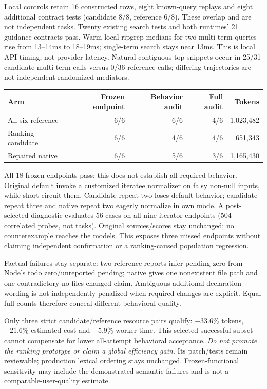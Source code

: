 \documentclass[11pt,a4paper]{article}
\newcommand{\code}[1]{\texttt{\detokenize{#1}}}
\begin{document}
Local controls retain 16 constructed rows, eight known-query replays and eight
additional contract tests (candidate 8/8, reference 6/8). These overlap and are
not independent tasks. Twenty existing search tests and both runtimes' 21 guidance
contracts pass. Warm local ripgrep medians for two multi-term queries rise from
13--14ms to 18--19ms; single-term search stays near 13ms. This is local API timing,
not provider latency. Natural contiguous top snippets occur in 25/31 candidate
multi-term calls versus 0/36 reference calls; differing trajectories are not
independent randomized mediators.

\begin{center}\begin{tabular}{@{}lrrrr@{}}\toprule
Arm & Frozen endpoint & Behavior audit & Full audit & Tokens \\\midrule
All-six reference & 6/6 & 6/6 & 4/6 & 1,023,482 \\
Ranking candidate & 6/6 & 4/6 & 4/6 & 651,343 \\
Repaired native & 6/6 & 5/6 & 3/6 & 1,165,430 \\\bottomrule
\end{tabular}\end{center}
All 18 frozen endpoints pass; this does not establish all required behavior.
Original default \code{forIn/forInRight} invoke a customized iteratee normalizer
on falsy non-null inputs, while \code{forOwn/forOwnRight} short-circuit them.
Candidate repeat two loses default behavior; candidate repeat three and native
repeat two eagerly normalize in own mode. A post-selected diagnostic evaluates
56 cases on all nine iterator endpoints (504 correlated probes, not tasks).
Original sources/scores stay unchanged; no counterexample reaches the models.
This exposes three missed endpoints without claiming independent confirmation
or a ranking-caused population regression.

Factual failures stay separate: two reference reports infer pending zero from
Node's todo zero/unreported pending; native gives one nonexistent file path and
one contradictory no-files-changed claim. Ambiguous additional-declaration
wording is not independently penalized when required changes are explicit.
Equal full counts therefore conceal different behavioral quality.

Only three strict candidate/reference resource pairs qualify: $-33.6\%$ tokens,
$-21.6\%$ estimated cost and $-5.9\%$ worker time. This selected successful
subset cannot compensate for lower all-attempt behavioral acceptance.
\emph{Do not promote the ranking prototype or claim a global efficiency gain.}
Its patch/tests remain reviewable; production lexical ordering stays unchanged.
Frozen-functional sensitivity may include the demonstrated semantic failures
and is not a comparable-user-quality estimate.
\end{document}
